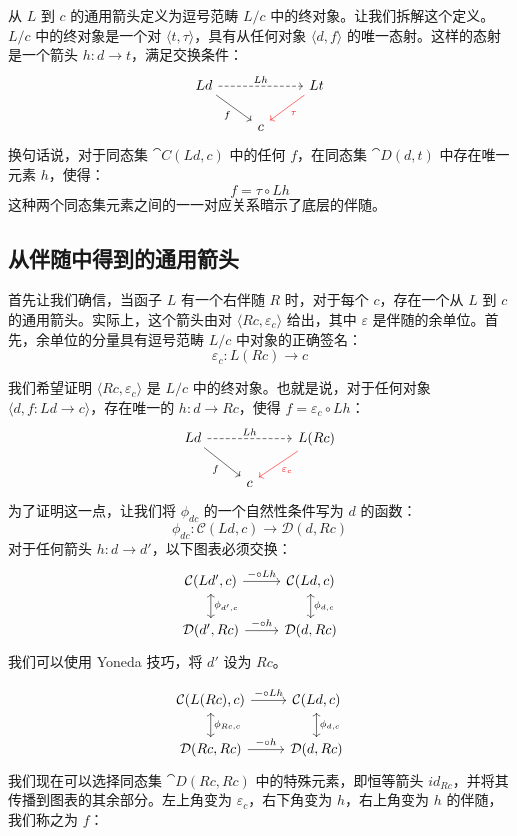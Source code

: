 \documentclass[DaoFP]{subfiles}
\begin{document}
从 $L$ 到 $c$ 的通用箭头定义为逗号范畴 $L / c$ 中的终对象。让我们拆解这个定义。$L/c$ 中的终对象是一个对 $\langle t, \tau \rangle$，具有从任何对象 $\langle d, f \rangle$ 的唯一态射。这样的态射是一个箭头 $h \colon d \to t$，满足交换条件：
\[
 \begin{tikzcd}
 L d
 \arrow[rd, "f"']
 \arrow[rr, dashed, "L h"]
 && L t
 \arrow[ld, red, "\tau"]
 \\
 &c
  \end{tikzcd}
\]
换句话说，对于同态集 $\cat C (L d, c)$ 中的任何 $f$，在同态集 $\cat D (d, t)$ 中存在唯一元素 $h$，使得：
\[ f = \tau \circ L h \]
这种两个同态集元素之间的一一对应关系暗示了底层的伴随。

\subsection{从伴随中得到的通用箭头}

首先让我们确信，当函子 $L$ 有一个右伴随 $R$ 时，对于每个 $c$，存在一个从 $L$ 到 $c$ 的通用箭头。实际上，这个箭头由对 $\langle R c, \varepsilon_c \rangle$ 给出，其中 $\varepsilon$ 是伴随的余单位。首先，余单位的分量具有逗号范畴 $L/c$ 中对象的正确签名：
\[ \varepsilon_c \colon L (R c) \to c \]

我们希望证明 $\langle R c, \varepsilon_c \rangle$ 是 $L/c$ 中的终对象。也就是说，对于任何对象 $\langle d, f \colon L d \to c \rangle$，存在唯一的 $h \colon d \to R c$，使得 $f = \varepsilon_c \circ L h$：
\[
 \begin{tikzcd}
 L d
 \arrow[rd, "f"']
 \arrow[rr, dashed, "L h"]
 && L (R c)
 \arrow[ld, red, "\varepsilon_c"]
 \\
 &c
  \end{tikzcd}
\]
为了证明这一点，让我们将 $\phi_{d c}$ 的一个自然性条件写为 $d$ 的函数：
\[  \phi_{d c} \colon \mathcal{C} (L d, c) \to \mathcal{D}( d , R c)\]
对于任何箭头 $h \colon d \to d'$，以下图表必须交换：
\[
 \begin{tikzcd}
 \mathcal{C}(L d', c)
 \arrow[d, leftrightarrow, "\phi_{d', c}"]
 \arrow[r, "- \circ L h"]
 &
 \mathcal{C}(L d, c)
  \arrow[d, leftrightarrow, "\phi_{d, c}"]
 \\
 \mathcal{D}(d', R c)
 \arrow[r, "- \circ h"]
& \mathcal{D}(d, R c)
 \end{tikzcd}
\]
我们可以使用 Yoneda 技巧，将 $d'$ 设为 $R c$。

\[
 \begin{tikzcd}
 \mathcal{C}(L (R c), c)
 \arrow[d, leftrightarrow, "\phi_{R c, c}"]
 \arrow[r, "- \circ L h"]
 &
 \mathcal{C}(L d, c)
  \arrow[d, leftrightarrow, "\phi_{d, c}"]
 \\
 \mathcal{D}(R c, R c)
 \arrow[r, "- \circ h"]
& \mathcal{D}(d, R c)
 \end{tikzcd}
\]
我们现在可以选择同态集 $\cat D(R c, R c)$ 中的特殊元素，即恒等箭头 $id_{R c}$，并将其传播到图表的其余部分。左上角变为 $\varepsilon_c$，右下角变为 $h$，右上角变为 $h$ 的伴随，我们称之为 $f$：
\end{document}

